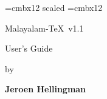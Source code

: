 
\font\big=cmbx12 scaled 
\font\twelvebf=cmbx12
\vskip 2cm

\centerline{\big Malayalam-\TeX\ v1.1}
\bigskip
\centerline{\big User's Guide}
\bigskip
\centerline{by}
\bigskip
\centerline{\bf Jeroen Hellingman}

\bye
